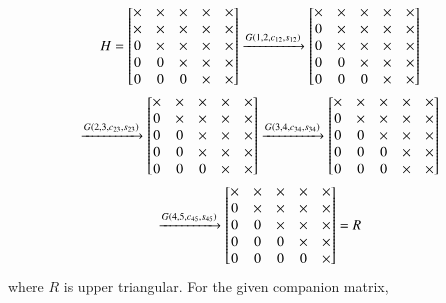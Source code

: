 \documentclass[journal]{IEEEtran}
\begin{document}
\begin{multline}
H = \begin{bmatrix}
\times & \times & \times & \times & \times\\
\times & \times & \times & \times & \times\\
0 & \times & \times & \times & \times\\
0 & 0 & \times & \times & \times\\
0 & 0 & 0 & \times & \times
\end{bmatrix} \xrightarrow{G\left(1, 2, c_{12}, s_{12}\right)}
\begin{bmatrix}
\times & \times & \times & \times & \times\\
0 & \times & \times & \times & \times\\
0 & \times & \times & \times & \times\\
0 & 0 & \times & \times & \times\\
0 & 0 & 0 & \times & \times
\end{bmatrix} \\\xrightarrow{G\left(2, 3, c_{23}, s_{23}\right)}
\begin{bmatrix}
\times & \times & \times & \times & \times\\
0 & \times & \times & \times & \times\\
0 & 0 & \times & \times & \times\\
0 & 0 & \times & \times & \times\\
0 & 0 & 0 & \times & \times
\end{bmatrix} \xrightarrow{G\left(3, 4, c_{34}, s_{34}\right)}
\begin{bmatrix}
\times & \times & \times & \times & \times\\
0 & \times & \times & \times & \times\\
0 & 0 & \times & \times & \times\\
0 & 0 & 0 & \times & \times\\
0 & 0 & 0 & \times & \times
\end{bmatrix} \\\xrightarrow{G\left(4, 5, c_{45}, s_{45}\right)}
\begin{bmatrix}
\times & \times & \times & \times & \times\\
0 & \times & \times & \times & \times\\
0 & 0 & \times & \times & \times\\
0 & 0 & 0 & \times & \times\\
0 & 0 & 0 & 0 & \times
\end{bmatrix} = R
\end{multline}
where $R$ is upper triangular.
For the given companion matrix,
\end{document}
